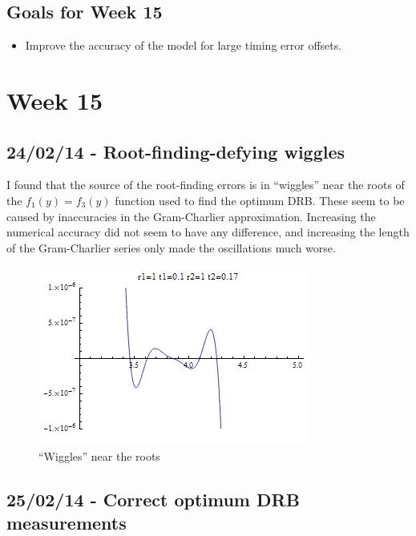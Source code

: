 \subsection{Goals for Week 15}

\begin{itemize}
\itemsep1pt\parskip0pt
\item
  Improve the accuracy of the model for large timing error offsets.
\end{itemize}

\section{Week 15}

\subsection{24/02/14 - Root-finding-defying wiggles}

I found that the source of the root-finding errors is in ``wiggles''
near the roots of the $f_1(y)=f_3(y)$ function used to find the optimum
DRB. These seem to be caused by inaccuracies in the Gram-Charlier
approximation. Increasing the numerical accuracy did not seem to have
any difference, and increasing the length of the Gram-Charlier series
only made the oscillations much worse.

\begin{figure}[htbp]
\centering
\includegraphics{../../../plots/rootfindingconfusion_M20_cropped.png}
\caption{``Wiggles'' near the roots}
\end{figure}

\subsection{25/02/14 - Correct optimum DRB measurements}

